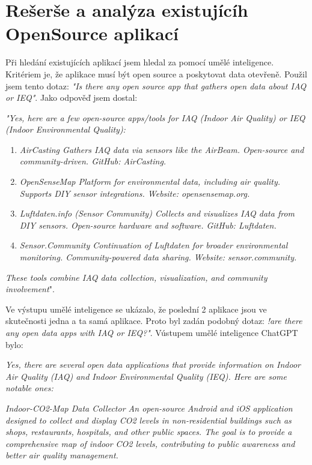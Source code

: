 \section{Rešerše a analýza existujícíh OpenSource aplikací}

Při hledání existujících aplikací jsem hledal za pomocí umělé inteligence. Kritériem je, že aplikace musí být open source a poskytovat data otevřeně. Použil jsem tento dotaz: \textit{"Is there any open source app that gathers open data about IAQ or IEQ"}. Jako odpověď jsem dostal: 

\textit{"Yes, here are a few open-source apps/tools for IAQ (Indoor Air Quality) or IEQ (Indoor Environmental Quality):}
\begin{enumerate}
	\item{\textit{AirCasting
		Gathers IAQ data via sensors like the AirBeam.
		Open-source  and \newline community-driven.
		GitHub: AirCasting.}}
	
	\item{\textit{OpenSenseMap
		Platform for environmental data, including air quality.
		Supports DIY sensor integrations.
		Website: opensensemap.org.}}
	
	\item{\textit{Luftdaten.info (Sensor Community)
		Collects and visualizes IAQ data from DIY sensors.
		Open-source hardware and software.
		GitHub: Luftdaten.}}
	
	\item{\textit{Sensor.Community
		Continuation of Luftdaten for broader environmental monitoring.
		Community-powered data sharing.
		Website: sensor.community.}}
\end{enumerate}
\textit{These tools combine IAQ data collection, visualization, and community involvement}"\newline \parencite{openaiChatGPT2024}.


Ve výstupu umělé inteligence se ukázalo, že poslední 2 aplikace jsou ve skutečnosti jedna a ta samá aplikace.
Proto byl zadán podobný dotaz:
\textit{!are there any open data apps with IAQ or IEQ?"}. Vústupem umělé inteligence ChatGPT bylo:

\textit{Yes, there are several open data applications that provide information on Indoor Air Quality (IAQ) and Indoor Environmental Quality (IEQ). Here are some notable ones:}

\textit{Indoor-CO2-Map Data Collector
An open-source Android and iOS application designed to collect and display CO2 levels in non-residential buildings such as shops, restaurants, hospitals, and other public spaces. The goal is to provide a comprehensive map of indoor CO2 levels, contributing to public awareness and better air quality management. }

